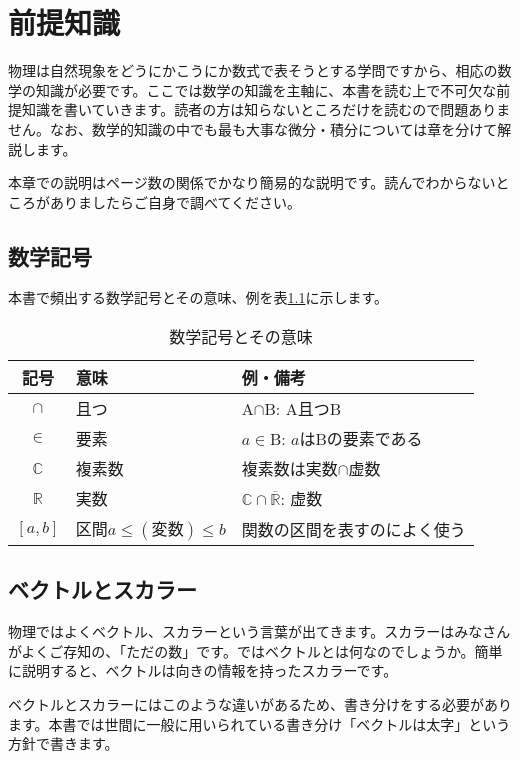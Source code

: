 \chapter{前提知識}
\label{premise}
物理は自然現象をどうにかこうにか数式で表そうとする学問ですから、相応の数学の知識が必要です。ここでは数学の知識を主軸に、本書を読む上で不可欠な前提知識を書いていきます。読者の方は知らないところだけを読むので問題ありません。なお、数学的知識の中でも最も大事な微分・積分については章を分けて解説します。

本章での説明はページ数の関係でかなり簡易的な説明です。読んでわからないところがありましたらご自身で調べてください。

\section{数学記号}
\label{math}
本書で頻出する数学記号とその意味、例を表\ref{tab:math}に示します。

\begin{table}[htb]
 \begin{center}
  \caption{数学記号とその意味}
  \label{tab:math}
  \begin{tabular}{c|l|l}
    \hline
    記号 & 意味 & 例・備考\\
    \hline\hline
    $\cap$ & 且つ & A$\cap$B: A且つB\\
    $\in$ & 要素 & $a\in$B: $a$はBの要素である \\
    $\mathbb{C}$ & 複素数 & 複素数は実数$\cap$虚数\\
    $\mathbb{R}$ & 実数 & $\mathbb{C}\cap\overline{\mathbb{R}}$: 虚数\\
    $[a,b]$ & 区間$a\leq (変数)\leq b$ & 関数の区間を表すのによく使う\\
    
  \end{tabular}
 \end{center}
\end{table}



\section{ベクトルとスカラー}
\label{vector}
物理ではよくベクトル、スカラーという言葉が出てきます。スカラーはみなさんがよくご存知の、「ただの数」です。ではベクトルとは何なのでしょうか。簡単に説明すると、ベクトルは向きの情報を持ったスカラーです。

ベクトルとスカラーにはこのような違いがあるため、書き分けをする必要があります。本書では世間に一般に用いられている書き分け「ベクトルは太字」という方針で書きます。


